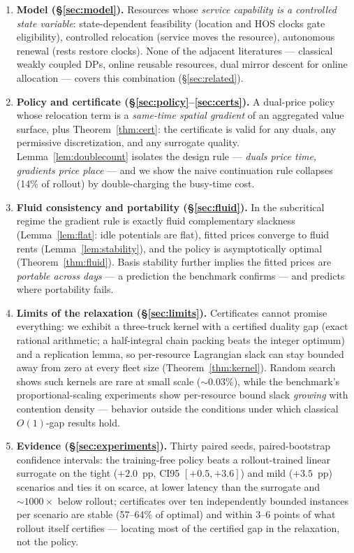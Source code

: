 \documentclass[11pt]{article}
\begin{document}
\begin{enumerate}
\item \textbf{Model (\S\ref{sec:model}).} Resources whose \emph{service
  capability is a controlled state variable}: state-dependent
  feasibility (location and HOS clocks gate eligibility), controlled
  relocation (service moves the resource), autonomous renewal (rests
  restore clocks). None of the adjacent literatures --- classical weakly
  coupled DPs, online reusable resources, dual mirror descent for online
  allocation --- covers this combination (\S\ref{sec:related}).
\item \textbf{Policy and certificate (\S\ref{sec:policy}--\ref{sec:certs}).}
  A dual-price policy whose relocation term is a \emph{same-time spatial
  gradient} of an aggregated value surface, plus Theorem~\ref{thm:cert}:
  the certificate is valid for any duals, any permissive discretization,
  and any surrogate quality. Lemma~\ref{lem:doublecount} isolates the
  design rule --- \emph{duals price time, gradients price place} --- and
  we show the naive continuation rule collapses (14\% of rollout) by
  double-charging the busy-time cost.
\item \textbf{Fluid consistency and portability (\S\ref{sec:fluid}).} In
  the subcritical regime the gradient rule is exactly fluid
  complementary slackness (Lemma~\ref{lem:flat}: idle potentials are
  flat), fitted prices converge to fluid rents
  (Lemma~\ref{lem:stability}), and the policy is asymptotically optimal
  (Theorem~\ref{thm:fluid}). Basis stability further implies the fitted
  prices are \emph{portable across days} --- a prediction the benchmark
  confirms --- and predicts where portability fails.
\item \textbf{Limits of the relaxation (\S\ref{sec:limits}).}
  Certificates cannot promise everything: we exhibit a three-truck
  kernel with a certified duality gap (exact rational arithmetic; a
  half-integral chain packing beats the integer optimum) and a
  replication lemma, so per-resource Lagrangian slack can stay bounded
  away from zero at every fleet size (Theorem~\ref{thm:kernel}). Random
  search shows such kernels are rare at small scale (${\sim}0.03\%$),
  while the benchmark's proportional-scaling experiments show
  per-resource bound slack \emph{growing} with contention density ---
  behavior outside the conditions under which classical $O(1)$-gap
  results hold.
\item \textbf{Evidence (\S\ref{sec:experiments}).} Thirty paired seeds,
  paired-bootstrap confidence intervals: the training-free policy beats
  a rollout-trained linear surrogate on the tight ($+2.0$~pp, CI95
  $[+0.5, +3.6]$) and mild ($+3.5$~pp) scenarios and ties it on scarce,
  at lower latency than the
  surrogate and ${\sim}1000\times$ below rollout; certificates over ten
  independently bounded instances per scenario are stable (57--64\% of
  optimal) and within 3--6 points of what rollout itself certifies ---
  locating most of the certified gap in the relaxation, not the policy.
\end{enumerate}
\end{document}
